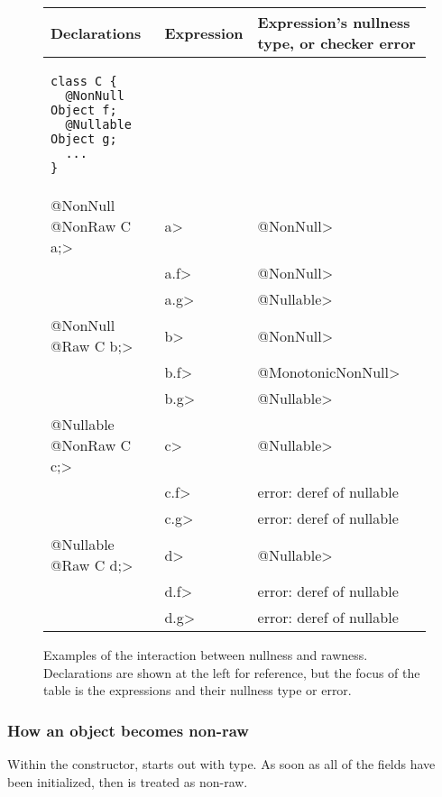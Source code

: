 \begin{figure}
\begin{tabular}{l|l|l}
Declarations & Expression & Expression's nullness type, or checker error \\ \hline
\begin{minipage}{1.5in}
\begin{Verbatim}
class C {
  @NonNull Object f;
  @Nullable Object g;
  ...
}
\end{Verbatim}
\end{minipage} & & \\ \cline{2-3}
\<@NonNull @NonRaw C a;>
& \<a> & \<@NonNull> \\
& \<a.f> & \<@NonNull> \\
& \<a.g> & \<@Nullable> \\ \cline{2-3}
\<@NonNull @Raw C b;>
& \<b> & \<@NonNull> \\
& \<b.f> & \<@MonotonicNonNull> \\
& \<b.g> & \<@Nullable> \\ \cline{2-3}
\<@Nullable @NonRaw C c;>
& \<c> & \<@Nullable> \\
& \<c.f> & error: deref of nullable \\
& \<c.g> & error: deref of nullable \\ \cline{2-3}
\<@Nullable @Raw C d;>
& \<d> & \<@Nullable> \\
& \<d.f> & error: deref of nullable \\
& \<d.g> & error: deref of nullable \\
\end{tabular}
\caption{Examples of the interaction between nullness and rawness.
  Declarations are shown at the left for reference, but the focus of the
  table is the expressions and their nullness type or error.}
\label{fig-rawness-examples}
\end{figure}




\subsubsection{How an object becomes non-raw\label{becoming-non-raw}}

Within the constructor,
 starts out with  type.
As soon as all of the  fields
have been initialized, then  is treated as non-raw.

